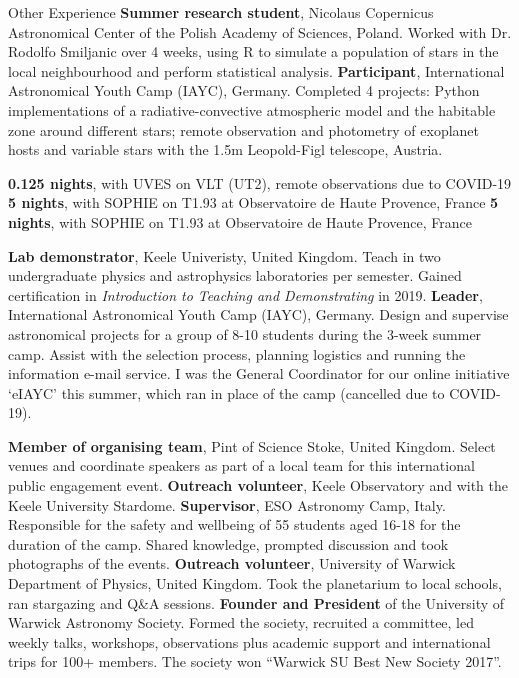 \begin{rubric}{Other Experience}
\entry*[2017]%
    \textbf{Summer research student}, Nicolaus Copernicus Astronomical Center of the Polish Academy of Sciences, Poland. Worked with Dr. Rodolfo Smiljanic over 4 weeks, using R to simulate a population of stars in the local neighbourhood and perform statistical analysis.
\entry*[2014 -- 2017]%
    \textbf{Participant}, International Astronomical Youth Camp (IAYC), Germany. Completed 4 projects: Python implementations of a radiative-convective atmospheric model and the habitable zone around different stars; remote observation and photometry of exoplanet hosts and variable stars with the 1.5m Leopold-Figl telescope, Austria.
    
\entry*[Oct. 2020]
    \textbf{0.125 nights}, with UVES on VLT (UT2), remote observations due to COVID-19
\entry*[Mar. 2020]
    \textbf{5 nights}, with SOPHIE on T1.93 at Observatoire de Haute Provence, France
\entry*[Sep. 2019]
    \textbf{5 nights}, with SOPHIE on T1.93 at Observatoire de Haute Provence, France

%
    \textbf{Lab demonstrator}, Keele Univeristy, United Kingdom. Teach in two undergraduate physics and astrophysics laboratories per semester. Gained certification in \emph{Introduction to Teaching and Demonstrating} in 2019.
%
    \textbf{Leader}, International Astronomical Youth Camp (IAYC), Germany. Design and supervise astronomical projects for a group of 8-10 students during the 3-week summer camp. Assist with the selection process, planning logistics and running the information e-mail service. I was the General Coordinator for our online initiative `eIAYC' this summer, which ran in place of the camp (cancelled due to COVID-19).

%
    \textbf{Member of organising team}, Pint of Science Stoke, United Kingdom. Select venues and coordinate speakers as part of a local team for this international public engagement event.
%
    \textbf{Outreach volunteer}, Keele Observatory and with the Keele University Stardome. 
\entry*[2017 -- 2019]%
    \textbf{Supervisor}, ESO Astronomy Camp, Italy. Responsible for the safety and wellbeing of 55 students aged 16-18 for the duration of the camp. Shared knowledge, prompted discussion and took photographs of the events.
\entry*[2017 -- 2018]%
    \textbf{Outreach volunteer}, University of Warwick Department of Physics, United Kingdom. Took the planetarium to local schools, ran stargazing and Q\&A sessions.
\entry*[2016 -- 2018]%
    \textbf{Founder and President} of the University of Warwick Astronomy Society. Formed the society, recruited a committee, led weekly talks, workshops, observations plus academic support and international trips for 100+ members. The society won “Warwick SU Best New Society 2017”.
\end{rubric}